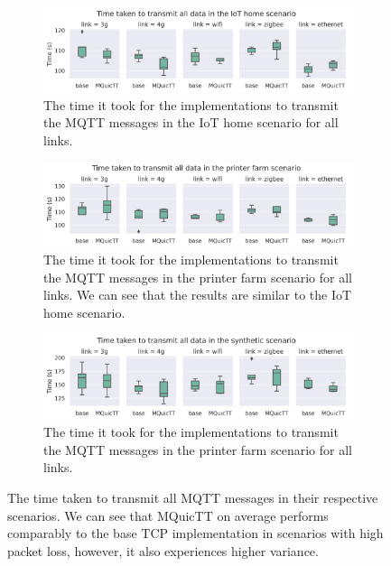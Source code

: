 \begin{figure}
    \begin{center}
        \begin{subfigure}[b]{1\textwidth}
            \includegraphics[width=1\linewidth]{images/analysis_comm_time_home.png}
            \caption{The time it took for the implementations to transmit the MQTT messages in the IoT home scenario for all links.
            }
            \label{fig:comm_time_home}
        \end{subfigure}
        \vspace{1.5em}

        \begin{subfigure}[b]{1\textwidth}
            \includegraphics[width=1\linewidth]{images/analysis_comm_time_farm.png}
            \caption{The time it took for the implementations to transmit the MQTT messages in the printer farm scenario for all links.
                We can see that the results are similar to the IoT home scenario.}
            \label{fig:comm_time_farm}
        \end{subfigure}
        \vspace{1.5em}

        \begin{subfigure}[b]{1\textwidth}
            \includegraphics[width=1\linewidth]{images/analysis_comm_time_synth.png}
            \caption{The time it took for the implementations to transmit the MQTT messages in the printer farm scenario for all links.}
            \label{fig:comm_time_synth}
        \end{subfigure}

        \caption{The time taken to transmit all MQTT messages in their respective scenarios.
            We can see that MQuicTT on average performs comparably to the base TCP implementation in scenarios with high packet loss, however, it also experiences higher variance.}
        \label{fig:comm_time}
    \end{center}
\end{figure}

